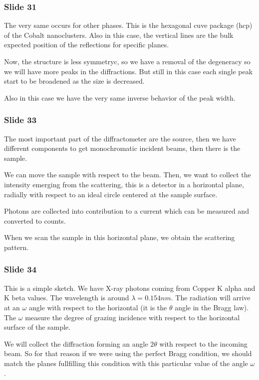 \documentclass[../main/main.tex]{subfiles}
\begin{document}
\subsubsection{Slide 31}
The very same occurs for other phases. This is the hexagonal cuve package (hcp) of the Cobalt nanoclusters. Also in this case, the vertical lines are the bulk expected position of the reflections for specific planes.

Now, the structure is less symmetryc, so we have a removal of the degeneracy so we will have more peaks in the diffractions. But still in this case each single peak start to be broadened as the size is decreased.

Also in this case we have the very same inverse behavior of the peak width.

\subsubsection{Slide 33}
The most important part of the diffractometer are the source, then we have different components to get monochromatic incident beams, then there is the sample.

We can move the sample with respect to the beam. Then, we want to collect the intensity emerging from the scattering, this is a detector in a horizontal plane, radially with respect to an ideal circle centered at the sample surface.

Photons are collected into contribution to a current which can be measured and converted to counts.

When we scan the sample in this horizontal plane, we obtain the scattering pattern.

\subsubsection{Slide 34}
This is a simple sketch. We have X-ray photons coming from Copper K alpha and K beta values. The wavelength is around \( \lambda = 0.154 nm \). The radiation will arrive at an \( \omega  \) angle with respect to the horizontal (it is the \( \theta  \) angle in the Bragg law).
The \( \omega  \) measure the degree of grazing incidence with respect to the horizontal surface of the sample.

We will collect the diffraction forming an angle \( 2 \theta  \) with respect to the incoming beam. So for that reason if we were using the perfect Bragg condition, we should match the planes fullfilling this condition with this particular value of the angle \( \omega  \).
\end{document}
